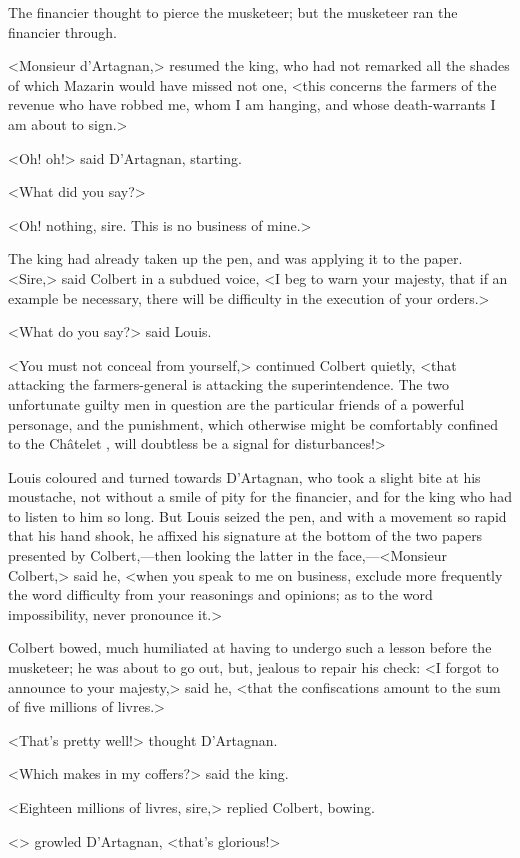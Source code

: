 The financier thought to pierce the musketeer; but the musketeer ran the financier through.

<Monsieur d'Artagnan,> resumed the king, who had not remarked all the shades of which Mazarin would have missed not one, <this concerns the farmers of the revenue who have robbed me, whom I am hanging, and whose death-warrants I am about to sign.>

<Oh! oh!> said D'Artagnan, starting.

<What did you say?>

<Oh! nothing, sire. This is no business of mine.>

The king had already taken up the pen, and was applying it to the paper. <Sire,> said Colbert in a subdued voice, <I beg to warn your majesty, that if an example be necessary, there will be difficulty in the execution of your orders.>

<What do you say?> said Louis.

<You must not conceal from yourself,> continued Colbert quietly, <that attacking the farmers-general is attacking the superintendence. The two unfortunate guilty men in question are the particular friends of a powerful personage, and the punishment, which otherwise might be comfortably confined to the Châtelet , will doubtless be a signal for disturbances!>

Louis coloured and turned towards D'Artagnan, who took a slight bite at his moustache, not without a smile of pity for the financier, and for the king who had to listen to him so long. But Louis seized the pen, and with a movement so rapid that his hand shook, he affixed his signature at the bottom of the two papers presented by Colbert,—then looking the latter in the face,—<Monsieur Colbert,> said he, <when you speak to me on business, exclude more frequently the word difficulty from your reasonings and opinions; as to the word impossibility, never pronounce it.>

Colbert bowed, much humiliated at having to undergo such a lesson before the musketeer; he was about to go out, but, jealous to repair his check: <I forgot to announce to your majesty,> said he, <that the confiscations amount to the sum of five millions of livres.>

<That's pretty well!> thought D'Artagnan.

<Which makes in my coffers?> said the king.

<Eighteen millions of livres, sire,> replied Colbert, bowing.

<> growled D'Artagnan, <that's glorious!>

